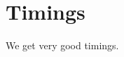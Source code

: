 \documentclass[a4paper,11pt,reqno]{amsart}%
\theoremstyle{definition}
\theoremstyle{plain}
\theoremstyle{remark}
\newcommand\ct[1]{\text{\rmfamily\upshape #1}}
\newcommand{\IntExpX}{\ct{IntExp}_X}
\newcommand{\IntExpY}{\ct{IntExp}_Y}
\begin{document}
%


\section{Timings}

We get very good timings.



\end{document}
